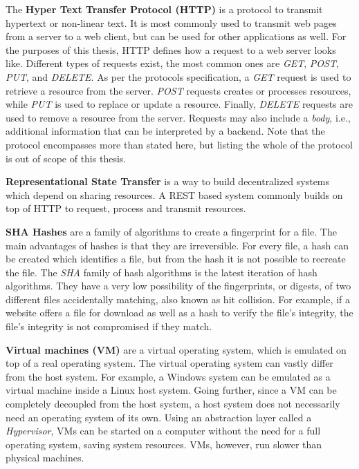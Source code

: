 The \textbf{Hyper Text Transfer Protocol (HTTP)}\cite{http-rfc} is a protocol to transmit hypertext or non-linear text.
It is most commonly used to transmit web pages from a server to a web client, but can be used for other applications as well.
For the purposes of this thesis, HTTP defines how a request to a web server looks like.
Different types of requests exist, the most common ones are \textit{GET}, \textit{POST}, \textit{PUT}, and \textit{DELETE}.
As per the protocols specification, a \textit{GET} request is used to retrieve a resource from the server.
\textit{POST} requests creates or processes resources, while \textit{PUT} is used to replace or update a resource.
Finally, \textit{DELETE} requests are used to remove a resource from the server.
Requests may also include a \textit{body}, i.e., additional information that can be interpreted by a backend.
Note that the protocol encompasses more than stated here, but listing the whole of the protocol is out of scope of this thesis.

\textbf{Representational State Transfer}\cite{extending-representation-state-transfer} is a way to build decentralized systems which depend on sharing resources.
A REST based system commonly builds on top of HTTP to request, process and transmit resources.

\pagebreak

\textbf{SHA Hashes}\cite{cryptographic-hash-functions,sha-hashes} are a family of algorithms to create a fingerprint for a file.
The main advantages of hashes is that they are irreversible.
For every file, a hash can be created which identifies a file, but from the hash it is not possible to recreate the file.
The \textit{SHA} family of hash algorithms is the latest iteration of hash algorithms.
They have a very low possibility of the fingerprints, or digests, of two different files accidentally matching, also known as hit collision.
For example, if a website offers a file for download as well as a hash to verify the file's integrity, the file's integrity is not compromised if they match.

\textbf{Virtual machines (VM)}\cite{what-is-a-virtual-machine} are a virtual operating system, which is emulated on top of a real operating system.
The virtual operating system can vastly differ from the host system.
For example, a Windows system can be emulated as a virtual machine inside a Linux host system.
Going further, since a VM can be completely decoupled from the host system, a host system does not necessarily need an operating system of its own.
Using an abstraction layer called a \textit{Hypervisor}, VMs can be started on a computer without the need for a full operating system, saving system resources.
VMs, however, run slower than physical machines.

